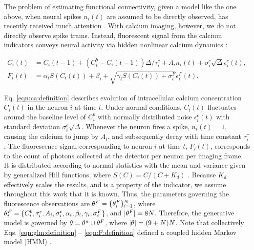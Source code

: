 
The problem of estimating functional connectivity, given a model like the one above, when neural spikes $n_i(t)$ are assumed to be directly observed, has recently received much attention \cite{PILL07}. With calcium imaging, however, we do not directly observe spike trains. Instead, fluorescent signal from the calcium indicators conveys neural activity via hidden nonlinear calcium dynamics \cite{Vogelstein2009}: 

\begin{align} \label{eqn:ca:definition} %
C_i(t) &= C_i(t-1) + (C_i^b-C_i(t-1)) \Delta/\tau^c_i + A_i n_i(t)+\sigma^c_i \sqrt{\Delta} \epsilon^c_i(t), \\
F_i(t) &= \alpha_i S(C_i(t)) + \beta_i + \sqrt{\gamma_i S(C_i(t)) + \sigma^F_i} \epsilon^F_i(t). \label{eqn:F:definition}
\end{align}

Eq. \eqref{eqn:ca:definition} describes evolution of intracellular calcium concentration $C_i(t)$ in the neuron $i$ at time $t$. Under normal conditions, $C_i(t)$ fluctuates around the baseline level of $C_i^b$ with normally distributed noise $\epsilon^c_i(t)$ with standard deviation $\sigma^c_i \sqrt{\Delta}$.  Whenever the neuron fires a spike, $n_i(t)=1$, causing the calcium to jump by $A_i$, and subsequently decay with time constant $\tau^c_i$.  The fluorescence signal corresponding to neuron $i$ at time $t$, $F_i(t)$, corresponds to the count of photons collected at the detector per neuron per imaging frame. It is distributed according to normal statistics with the mean and variance given by generalized Hill functions, where $S(C)=C/(C+K_d)$ \cite{Yasuda2004}.  Because $K_d$ effectively scales the results, and is a property of the indicator, we assume throughout this work that it is known.  Thus, the parameters governing the fluorescence observations are $\mathbf{\theta}^F=\{\mathbf{\theta}^F_i\}_{i=1}^N$, where $\mathbf{\theta}^F_i=\{C^b_i, \tau^c_i, A_i, \sigma^c_i, \alpha_i, \beta_i, \gamma_i, \sigma^F_i\}$, and $|\mathbf{\theta}^F|=8N$.  Therefore, the generative model is governed by $\mathbf{\theta}=\mathbf{\theta}^n \cup \mathbf{\theta}^F$, where $|\mathbf{\theta}|=(9+N)N$. Note that collectively Eqs. \eqref{eqn:glm:definition} -- \eqref{eqn:F:definition} defined a coupled hidden Markov model (HMM) \cite{ShumwayStoffer06}.

